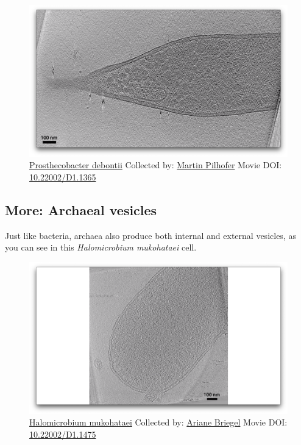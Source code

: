 \documentclass[]{tufte-book}
\begin{document}
\begin{figure}
\includegraphics{movie_stills/2_4d} \caption[\protect\hyperlink{tree}{Prosthecobacter debontii} Collected
by: \protect\hyperlink{martin_pilhofer}{Martin Pilhofer} Movie DOI:
\href{https://doi.org/10.22002/D1.1365}{10.22002/D1.1365}]{\protect\hyperlink{tree}{Prosthecobacter debontii} Collected
by: \protect\hyperlink{martin_pilhofer}{Martin Pilhofer} Movie DOI:
\href{https://doi.org/10.22002/D1.1365}{10.22002/D1.1365}}\label{fig:2-4d}
\end{figure}

\hypertarget{Archaeal_vesicles}{\subsection*{More: Archaeal
vesicles}\label{Archaeal_vesicles}}

Just like bacteria, archaea also produce both internal and external
vesicles, as you can see in this \emph{Halomicrobium mukohataei} cell.





\begin{figure}
\includegraphics{movie_stills/2_4e} \caption[\protect\hyperlink{tree}{Halomicrobium mukohataei} Collected
by: \protect\hyperlink{ariane_briegel}{Ariane Briegel} Movie DOI:
\href{https://doi.org/10.22002/D1.1475}{10.22002/D1.1475}]{\protect\hyperlink{tree}{Halomicrobium mukohataei} Collected
by: \protect\hyperlink{ariane_briegel}{Ariane Briegel} Movie DOI:
\href{https://doi.org/10.22002/D1.1475}{10.22002/D1.1475}}\label{fig:2-4e}
\end{figure}
\end{document}
